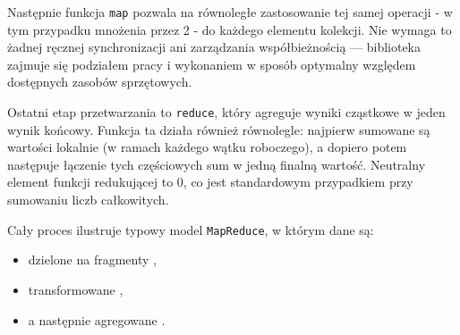 Następnie funkcja \texttt{map} pozwala na równoległe zastosowanie tej samej operacji - w tym przypadku mnożenia przez 2 - do każdego elementu kolekcji. Nie wymaga to żadnej ręcznej synchronizacji ani zarządzania współbieżnością — biblioteka zajmuje się podziałem pracy i wykonaniem w sposób optymalny względem dostępnych zasobów sprzętowych.

Ostatni etap przetwarzania to \texttt{reduce}, który agreguje wyniki cząstkowe w jeden wynik końcowy. Funkcja ta działa również równolegle: najpierw sumowane są wartości lokalnie (w ramach każdego wątku roboczego), a dopiero potem następuje łączenie tych częściowych sum w jedną finalną wartość. Neutralny element funkcji redukującej to 0, co jest standardowym przypadkiem przy sumowaniu liczb całkowitych.

Cały proces ilustruje typowy model \texttt{MapReduce}, w którym dane są:
\begin{itemize}
\item dzielone na fragmenty ,
\item transformowane ,
\item a następnie agregowane .
\end{itemize}